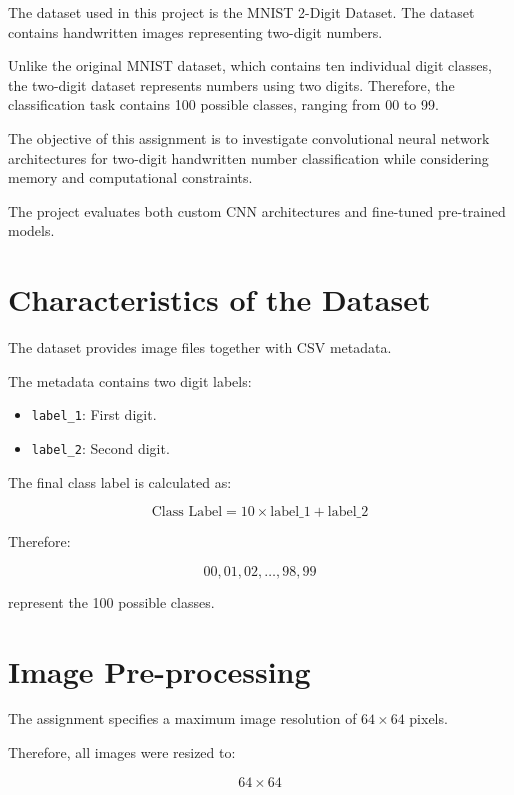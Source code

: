 \documentclass[12pt,a4paper]{report}
\begin{document}
The dataset used in this project is the MNIST 2-Digit Dataset.
The dataset contains handwritten images representing two-digit
numbers.

Unlike the original MNIST dataset, which contains ten individual
digit classes, the two-digit dataset represents numbers using two
digits. Therefore, the classification task contains 100 possible
classes, ranging from 00 to 99.

The objective of this assignment is to investigate convolutional
neural network architectures for two-digit handwritten number
classification while considering memory and computational
constraints.

The project evaluates both custom CNN architectures and
fine-tuned pre-trained models.

\section{Characteristics of the Dataset}

The dataset provides image files together with CSV metadata.

The metadata contains two digit labels:

\begin{itemize}
    \item \texttt{label\_1}: First digit.
    \item \texttt{label\_2}: Second digit.
\end{itemize}

The final class label is calculated as:

\[
\text{Class Label}
=
10\times\text{label\_1}
+
\text{label\_2}
\]

Therefore:

\[
00,01,02,\ldots,98,99
\]

represent the 100 possible classes.
\newpage
\section{Image Pre-processing}

The assignment specifies a maximum image resolution of
$64\times64$ pixels.

Therefore, all images were resized to:

\[
64\times64
\]
\end{document}
